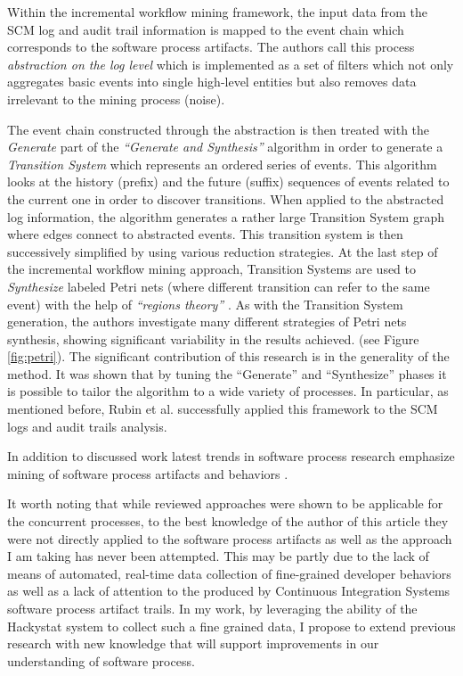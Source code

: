 \documentclass{sig-alternate}
\begin{document}
Within the incremental workflow mining framework, the input data from the SCM log and audit trail information is mapped to the event chain which corresponds to the software process artifacts. The authors call this process \textit{abstraction on the log level} which is implemented as a set of filters which not only aggregates basic events into single high-level entities but also removes data irrelevant to the mining process (noise). 

The event chain constructed through the abstraction is then treated with the \textit{Generate} part of the \textit{``Generate and Synthesis''} \cite{citeulike:3718014} algorithm in order to generate a \textit{Transition System} which represents an ordered series of events. This algorithm looks at the history (prefix) and the future (suffix) sequences of events related to the current one in order to discover transitions.  When applied to the abstracted log information, the algorithm generates a rather large Transition System graph where edges connect to abstracted events. This transition system is then successively simplified by using various reduction strategies. At the last step of the incremental workflow mining approach, Transition Systems are used to \textit{Synthesize} labeled Petri nets (where different transition can refer to the same event) with the help of \textit{``regions theory''} \cite{citeulike:5128170}. As with the Transition System generation, the authors investigate many different strategies of Petri nets synthesis, showing significant variability in the results achieved. (see Figure \ref{fig:petri}). The significant contribution of this research is in the generality of the method. It was shown that by tuning the ``Generate'' and ``Synthesize'' phases it is possible to tailor the algorithm to a wide variety of processes. In particular, as mentioned before, Rubin et al. successfully applied this framework to the SCM logs and audit trails analysis.

In addition to discussed work latest trends in software process research emphasize mining of software process artifacts and behaviors \cite{citeulike:5043664} \cite{citeulike:5112229}. 

It worth noting that while reviewed approaches were shown to be applicable for the concurrent processes, to the best knowledge of the author of this article they were not directly applied to the software process artifacts as well as the approach I am taking has never been attempted. This may be partly due to the lack of means of automated, real-time data collection of fine-grained developer behaviors as well as a lack of attention to the produced by Continuous Integration Systems software process artifact trails. In my work, by leveraging the ability of the Hackystat system \cite{citeulike:4041809} to collect such a fine grained data, I propose to extend previous research with new knowledge that will support improvements in our understanding of software process.
\end{document}
